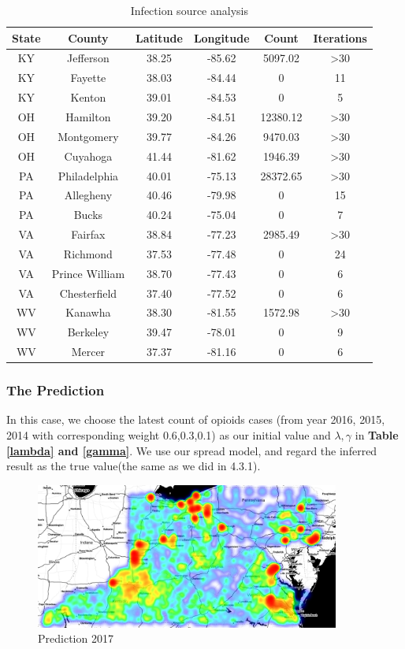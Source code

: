 \documentclass[12pt]{article}
\begin{document}
\begin{table}[h]
\centering
\begin{tabular}{cccccc}
  \toprule
State & County & Latitude & Longitude & Count &Iterations  \\
  \midrule
  KY &Jefferson &38.25 & -85.62&  5097.02 &>30 \\
KY &Fayette &38.03 & -84.44  &0 &11 \\
KY &Kenton &39.01  &-84.53 & 0 &5 \\
OH &Hamilton &39.20 & -84.51&  12380.12& >30 \\
OH &Montgomery &39.77  &-84.26& 9470.03& >30 \\
OH &Cuyahoga &41.44 & -81.62  &1946.39 &>30 \\
PA &Philadelphia &40.01 & -75.13  &28372.65& >30 \\
PA &Allegheny &40.46  &-79.98  &0 &15 \\
PA &Bucks &40.24 & -75.04 & 0 &7 \\
VA &Fairfax& 38.84 & -77.23  &2985.49& >30 \\
VA &Richmond &37.53 & -77.48 & 0 &24 \\
VA &Prince William& 38.70 & -77.43 & 0& 6 \\
VA &Chesterfield& 37.40 & -77.52  &0 &6 \\
WV &Kanawha &38.30 & -81.55 & 1572.98& >30 \\
WV &Berkeley &39.47 & -78.01&  0 &9 \\
WV &Mercer &37.37 & -81.16&  0 &6 \\
\bottomrule
\end{tabular}
\caption{Infection source analysis}
\label{infec}
\end{table}

\subsubsection{The Prediction}
In this case, we choose the latest count of opioids cases (from year 2016, 2015, 2014 with corresponding weight 0.6,0.3,0.1) as our initial value and $\lambda,\gamma$ in \textbf{Table \ref{lambda} and \ref{gamma}}. We use our spread model, and regard the inferred result as the true value(the same as we did in 4.3.1).

\begin{figure}[h]
\centering
\includegraphics[width=10cm]{plots/prediction2017.png}
\caption{Prediction 2017}
\label{pre17}
\end{figure}
\end{document}
